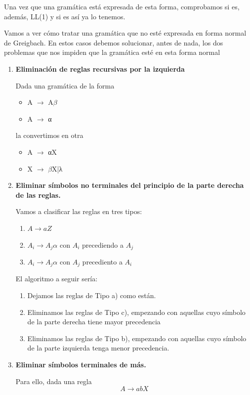 \documentclass{apuntes}
\begin{document}
Una vez que una gramática está expresada de esta forma, comprobamos si es, además, LL(1) y si es así ya lo tenemos.

Vamos a ver cómo tratar una gramática que no esté expresada en forma normal de Greigbach. En estos casos debemos solucionar, antes de nada, los dos problemas que nos impiden que la gramática esté en esta forma normal

\begin{enumerate}
\item \textbf{Eliminación de reglas recursivas por la izquierda}

Dada una gramática de la forma
\begin{itemize}
\item A $\rightarrow$ A$\beta$
\item A $\rightarrow$ α
\end{itemize}
la convertimos en otra
\begin{itemize}
\item A $\rightarrow$ αX
\item X $\rightarrow$ $\beta$X|λ
\end{itemize}

\item \textbf{Eliminar símbolos no terminales del principio de la parte derecha de las reglas.}


Vamos a clasificar las reglas en tres tipos:
\begin{enumerate}
\item $A \rightarrow aZ$
\item $A_i \rightarrow A_jα$ con $A_i$ precediendo a $A_j$
\item $A_i \rightarrow A_jα$ con $A_j$ precediento a $A_i$
\end{enumerate}

El algoritmo a seguir sería:
\begin{enumerate}
\item Dejamos las reglas de Tipo a) como están.
\item Eliminamos las reglas de Tipo c), empezando con aquellas cuyo símbolo de la parte derecha tiene mayor precedencia
\item Eliminamos las reglas de Tipo b), empezando con aquellas cuyo símbolo de la parte izquierda tenga menor precedencia.
\end{enumerate}
\item \textbf{Eliminar símbolos terminales de más.}

Para ello, dada una regla
\[A \rightarrow abX\]


\end{enumerate}
\end{document}
